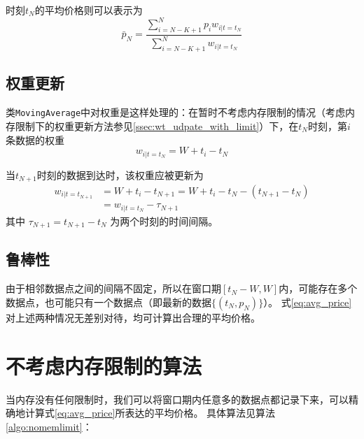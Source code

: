\documentclass[titlepage=false]{ctexart}
\begin{document}
时刻$t_N$的平均价格则可以表示为
\begin{equation}\label{eq:avg_price}
    \bar{p}_N = \frac{\sum_{i=N-K+1}^N{p_iw_{i|t=t_N}}}{\sum_{i=N-K+1}^N{w_{i|t=t_N}}}
\end{equation}

\subsection{权重更新}\label{ssec:wt_udpate_without_limit}
类\texttt{MovingAverage}中对权重是这样处理的：在暂时不考虑内存限制的情况（考虑内存限制下的权重更新方法参见\ref{ssec:wt_udpate_with_limit}）下，在$t_N$时刻，第$i$条数据的权重
\begin{equation}\label{eq:wt_update_N}
    w_{i|t=t_N} = W+t_i-t_N
\end{equation}

当$t_{N+1}$时刻的数据到达时，该权重应被更新为
\begin{align}\label{eq:wt_update_N+1}
    w_{i|t=t_{N+1}} &= W+t_i-t_{N+1} = W+t_i-t_N-(t_{N+1}-t_N)\\
                    &=w_{i|t=t_N} - \tau_{N+1}
\end{align}
其中 $\tau_{N+1}=t_{N+1}-t_N$ 为两个时刻的时间间隔。



\subsection{鲁棒性} 

由于相邻数据点之间的间隔不固定，所以在窗口期$[t_N-W,W]$内，可能存在多个数据点，也可能只有一个数据点（即最新的数据$\{(t_N,p_N)\}$）。
式\eqref{eq:avg_price}对上述两种情况无差别对待，均可计算出合理的平均价格。



\section{不考虑内存限制的算法}

当内存没有任何限制时，我们可以将窗口期内任意多的数据点都记录下来，可以精确地计算式\eqref{eq:avg_price}所表达的平均价格。
具体算法见算法\ref{algo:nomemlimit}：
\end{document}
